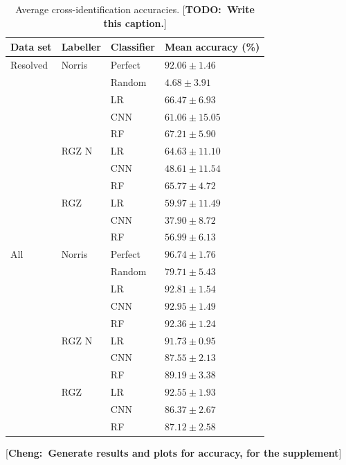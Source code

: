 \documentclass[fleqn,usenatbib,usedcolumn]{mnras}
\newcommand{\cheng}[1]{ {\color{teal}[{\bf Cheng:~{#1}}]} }
\newcommand{\todo}[1]{ {\color{red}[{\bf TODO:~{#1}}]} }
\begin{document}
  \begin{table}
    \caption{Average cross-identification accuracies. \todo{Write this caption.}}
    \label{tab:cross-id-accuracies}
    \begin{tabular}{lll|l}
      \hline
      Data set & Labeller & Classifier & Mean accuracy (\%)\\
      \hline
      Resolved & Norris & Perfect & $92.06 \pm 1.46$\\
       &  & Random & $4.68 \pm 3.91$\\
       &  & LR & $66.47 \pm 6.93$\\
       &  & CNN & $61.06 \pm 15.05$\\
       &  & RF & $67.21 \pm 5.90$\\
       & RGZ N & LR & $64.63 \pm 11.10$\\
       &  & CNN & $48.61 \pm 11.54$\\
       &  & RF & $65.77 \pm 4.72$\\
       & RGZ & LR & $59.97 \pm 11.49$\\
       &  & CNN & $37.90 \pm 8.72$\\
       &  & RF & $56.99 \pm 6.13$\\
      All & Norris & Perfect & $96.74 \pm 1.76$\\
       &  & Random & $79.71 \pm 5.43$\\
       &  & LR & $92.81 \pm 1.54$\\
       &  & CNN & $92.95 \pm 1.49$\\
       &  & RF & $92.36 \pm 1.24$\\
       & RGZ N & LR & $91.73 \pm 0.95$\\
       &  & CNN & $87.55 \pm 2.13$\\
       &  & RF & $89.19 \pm 3.38$\\
       & RGZ & LR & $92.55 \pm 1.93$\\
       &  & CNN & $86.37 \pm 2.67$\\
       &  & RF & $87.12 \pm 2.58$\\
      \hline
    \end{tabular}
  \end{table}

  \cheng{Generate results and plots for accuracy, for the supplement}
\end{document}
